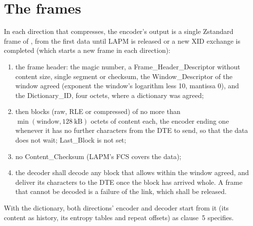 
\section{The frames}\label{sec:zstdframes}
In each direction that compresses, the encoder's output is a single
Zstandard frame of , from the first data until LAPM is
released or a new XID exchange is completed (which starts a new frame
in each direction):
\begin{enumerate}[label=\alph*)]
\item the frame header: the magic number, a Frame\_Header\_Descriptor
  without content size, single segment or checksum, the
  Window\_Descriptor of the window agreed (exponent the window's
  logarithm less 10, mantissa 0), and the Dictionary\_ID, four octets,
  where a dictionary was agreed;
\item then blocks (raw, RLE or compressed) of no more than
  $\min(\mathrm{window}, 128~\mathrm{kB})$ octets of content each, the
  encoder ending one whenever it has no further characters from the DTE
  to send, so that the data does not wait; Last\_Block is not set;
\item no Content\_Checksum (LAPM's FCS covers the data);
\item the decoder shall decode any block that  allows within
  the window agreed, and deliver its characters to the DTE once the
  block has arrived whole. A frame that cannot be decoded is a
  failure of the link, which shall be released.
\end{enumerate}
With the dictionary, both directions' encoder and decoder start from it
(its content as history, its entropy tables and repeat offsets) as
 clause~5 specifies.


